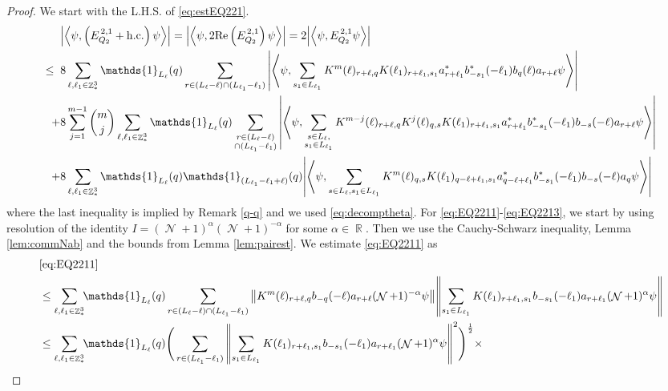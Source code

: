\documentclass[sn-mathphys, Numbered ,a4paper]{sn-jnl}%
\DeclareMathOperator{\R}{\mathbb{R}}
\DeclareMathOperator{\Z}{\mathbb{Z}}
\DeclareMathOperator{\NN}{\mathcal{N}}
\newcommand{\half}{\frac{1}{2}}
\newcommand{\eva}[1]{\left\langle #1 \right\rangle}
\theoremstyle{plain}
\theoremstyle{definition}
\theoremstyle{remark}
\theoremstyle{plain}
\theoremstyle{definition}
\theoremstyle{remark}
\begin{document}
\begin{proof}
 We start with the L.H.S. of \eqref{eq:estEQ221}.
 \begin{align}
 	&\abs{\eva{\psi,\left(E^{\,2,1}_{Q_2}+\mathrm{h.c.}\right) \psi }} = \abs{\eva{\psi,2\mathrm{Re}\left(E^{\,2,1}_{Q_2}\right) \psi }} = 2\abs{\eva{\psi, E^{\,2,1}_{Q_2} \psi }}\nonumber\\
 	\leq\;\;&8 \sum\limits_{\ell, \ell_1\in \Z^3_*} \mathds{1}_{L_{\ell}}(q) \sum\limits_{r\in (L_{\ell}-\ell) \cap (L_{\ell_1}-\ell_1)} \abs{\eva{\psi, \sum\limits_{ s_1\in L_{\ell_1} }  K^m(\ell )_{r+\ell,q}K(\ell_1)_{r+\ell_1,s_1}
 			a^*_{r+\ell_1} b^*_{-s_1}(-\ell_1)  b_{q}(\ell)a_{r+\ell} \psi}} \label{eq:EQ2211}\\
 	\;+&8 \sum\limits_{j=1}^{m-1} {{m}\choose j} \sum\limits_{\ell, \ell_1\in \Z^3_*}\mathds{1}_{L_{\ell}}(q) \sum\limits_{\substack{r\in (L_{\ell}-\ell) \\ \cap (L_{\ell_1}-\ell_1)}}  \abs{\eva{\psi, \sum\limits_{ \substack{s \in L_{\ell},\\s_1\in L_{\ell_1}} }   K^{m-j}(\ell)_{r+\ell,q} K^{j}(\ell)_{q,s} K(\ell_1)_{r+\ell_1,s_1} a^*_{r+\ell_1}  b^*_{-s_1}(-\ell_1) b_{-s}(-\ell) a_{r+\ell} \psi }} \label{eq:EQ2212}\\
 	\;+&8\sum\limits_{\ell, \ell_1\in \Z^3_*} \mathds{1}_{L_{\ell}}(q) \mathds{1}_{(L_{\ell_1}-\ell_1+\ell)}(q)  \abs{\eva{\psi, \sum\limits_{s \in L_{\ell},s_1\in L_{\ell_1}} K^m(\ell)_{q,s} K(\ell_1)_{q-\ell+\ell_1,s_1} a^*_{q-\ell+\ell_1} b^*_{-s_1}(-\ell_1) b_{-s}(-\ell) a_{q} \psi}} \label{eq:EQ2213}
 \end{align}
 where the last inequality is implied by Remark \ref{q-q} and we used \eqref{eq:decomptheta}.
 For \eqref{eq:EQ2211}-\eqref{eq:EQ2213}, we start by using resolution of the identity $I = (\NN+1)^{\alpha}(\NN+1)^{-\alpha}$ for some $\alpha \in \R$. Then we use the Cauchy-Schwarz inequality, Lemma \ref{lem:commNab} and the bounds from Lemma \ref{lem:pairest}.
 We estimate \eqref{eq:EQ2211} as
 \begin{align}
 	&\eqref{eq:EQ2211}\nonumber\\
 	&\leq\sum\limits_{\ell,\ell_1 \in \Z^3_*} \!\!\mathds{1}_{L_\ell}(q) \sum\limits_{r\in (L_{\ell}-\ell) \cap (L_{\ell_1}-\ell_1)}    \norm{ K^{m}(\ell)_{r+\ell,q} b_{-q}(-\ell) a_{r+\ell} (\NN+1)^{-\alpha}\psi}\norm{ \sum\limits_{s_1 \in L_{\ell_1}} K(\ell_1)_{r+\ell_1,s_1} b_{-s_1}(-\ell_1)   a_{r+\ell_1} (\NN+1)^{\alpha}\psi } \nonumber\\
 	&\leq \sum\limits_{\ell,\ell_1 \in \Z^3_*} \!\!\mathds{1}_{L_\ell}(q) \Bigg( \sum\limits_{r\in (L_{\ell_1}-\ell_1)} \norm{\sum\limits_{s_1 \in L_{\ell_1}} K(\ell_1)_{r+\ell_1,s_1} b_{-s_1}(-\ell_1) a_{r+\ell_1} (\NN+1)^{\alpha}\psi}^2\Bigg)^\half \times\nonumber\\

\end{align}
\end{proof}
\end{document}

